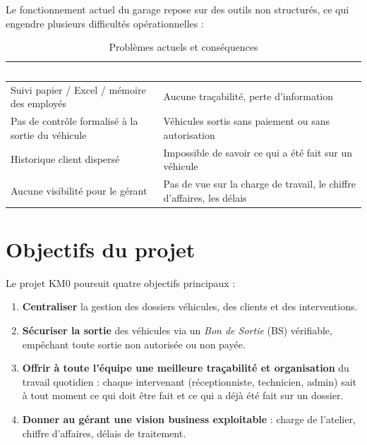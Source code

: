 \documentclass[11pt,a4paper]{report}
\begin{document}
Le fonctionnement actuel du garage repose sur des outils non structurés, ce qui engendre
plusieurs difficultés opérationnelles :

\begin{table}[h!]
\centering
{}
\begin{tabularx}{\linewidth}{@{}>{\raggedright\arraybackslash}X>{\raggedright\arraybackslash}X@{}}
\toprule
\rowcolor{km0blue}
\textcolor{white}{\textbf{Problème constaté}} & \textcolor{white}{\textbf{Conséquence}} \\
\midrule
Suivi papier / Excel / mémoire des employés & Aucune traçabilité, perte d'information \\
Pas de contrôle formalisé à la sortie du véhicule & Véhicules sortis sans paiement ou sans autorisation \\
Historique client dispersé & Impossible de savoir ce qui a été fait sur un véhicule \\
Aucune visibilité pour le gérant & Pas de vue sur la charge de travail, le chiffre d'affaires, les délais \\
\bottomrule
\end{tabularx}
\caption{Problèmes actuels et conséquences}
\end{table}

\section{Objectifs du projet}

Le projet KM0 poursuit quatre objectifs principaux :

\begin{enumerate}[label=\arabic*., leftmargin=1.2cm]
\item \textbf{Centraliser} la gestion des dossiers véhicules, des clients et des interventions.
\item \textbf{Sécuriser la sortie} des véhicules via un \emph{Bon de Sortie} (BS) vérifiable,
      empêchant toute sortie non autorisée ou non payée.
\item \textbf{Offrir à toute l'équipe une meilleure traçabilité et organisation} du travail
      quotidien : chaque intervenant (réceptionniste, technicien, admin) sait à tout moment
      ce qui doit être fait et ce qui a déjà été fait sur un dossier.
\item \textbf{Donner au gérant une vision business exploitable} : charge de l'atelier,
      chiffre d'affaires, délais de traitement.
\end{enumerate}
\end{document}
